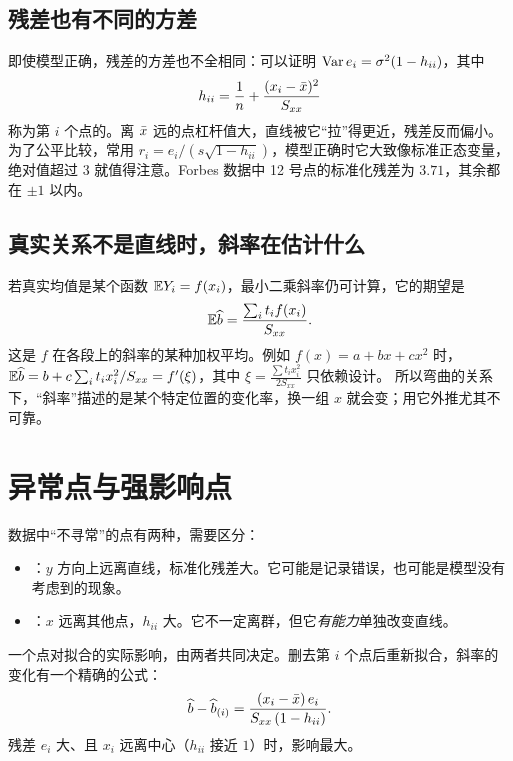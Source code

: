 \subsection{残差也有不同的方差}

即使模型正确，残差的方差也不全相同：可以证明 $\operatorname{Var} e_i=\sigma^2(1-h_{ii})$，其中
\[
h_{ii}=\frac1n+\frac{(x_i-\bar{x})^2}{S_{xx}}
\]
称为第 $i$ 个点的。离 $\bar{x}$ 远的点杠杆值大，直线被它“拉”得更近，残差反而偏小。为了公平比较，常用
$r_i=e_i/(s\sqrt{1-h_{ii}})$，模型正确时它大致像标准正态变量，绝对值超过 $3$ 就值得注意。Forbes 数据中 12 号点的标准化残差为 $3.71$，其余都在 $\pm1$ 以内。

\subsection{真实关系不是直线时，斜率在估计什么}

若真实均值是某个函数 $\mathbb{E} Y_i=f(x_i)$，最小二乘斜率仍可计算，它的期望是
\[
\mathbb{E}\widehat{b}=\frac{\sum_it_if(x_i)}{S_{xx}} .
\]
这是 $f$ 在各段上的斜率的某种加权平均。例如 $f(x)=a+bx+cx^2$ 时，$\mathbb{E}\widehat{b}=b+c\sum_it_ix_i^2/S_{xx}=f'(\xi)$，其中 $\xi=\frac{\sum t_ix_i^2}{2S_{xx}}$ 只依赖设计。
所以弯曲的关系下，“斜率”描述的是某个特定位置的变化率，换一组 $x$ 就会变；用它外推尤其不可靠。

\section{异常点与强影响点}

数据中“不寻常”的点有两种，需要区分：
\begin{itemize}
\item {}：$y$ 方向上远离直线，标准化残差大。它可能是记录错误，也可能是模型没有考虑到的现象。
\item {}：$x$ 远离其他点，$h_{ii}$ 大。它不一定离群，但它\emph{有能力}单独改变直线。
\end{itemize}
一个点对拟合的实际影响，由两者共同决定。删去第 $i$ 个点后重新拟合，斜率的变化有一个精确的公式：
\[
\widehat{b}-\widehat{b}_{(i)}=\frac{(x_i-\bar{x})\,e_i}{S_{xx}\,(1-h_{ii})} .
\]
残差 $e_i$ 大、且 $x_i$ 远离中心（$h_{ii}$ 接近 $1$）时，影响最大。

